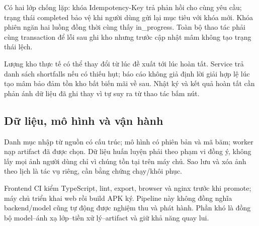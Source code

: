 Có hai lớp chống lặp: khóa Idempotency-\allowbreak{}Key trả phản hồi cho cùng yêu cầu; trạng thái completed bảo vệ khi người dùng gửi lại mục tiêu với khóa mới. Khóa phiên ngăn hai luồng đồng thời cùng thấy in\_\allowbreak{}progress. Toàn bộ thao tác phải cùng transaction để lỗi sau ghi kho nhưng trước cập nhật mâm không tạo trạng thái lệch.

Lượng kho thực tế có thể thay đổi từ lúc đề xuất tới lúc hoàn tất. Service trả danh sách shortfalls nếu có thiếu hụt; báo cáo không giả định lời giải hợp lệ lúc tạo mâm bảo đảm tồn kho bất biến mãi về sau. Nhật ký và kết quả hoàn tất cần phản ánh dữ liệu đã ghi thay vì tự suy ra từ thao tác bấm nút.

\subsection{Dữ liệu, mô hình và vận hành}
Danh mục nhập từ nguồn có cấu trúc; mô hình có phiên bản và mã băm; worker nạp artifact đã được chọn. Dữ liệu huấn luyện phải theo phạm vi đồng ý, không lấy mọi ảnh người dùng chỉ vì chúng tồn tại trên máy chủ. Sao lưu và xóa ảnh theo lịch là tác vụ riêng, cần bằng chứng chạy/\allowbreak{}khôi phục.

Frontend CI kiểm TypeScript, lint, export, browser và nginx trước khi promote; máy chủ triển khai web rồi build APK ký. Pipeline này không đồng nghĩa backend/\allowbreak{}model cũng tự động được nghiệm thu và phát hành. Phần khó là đồng bộ model--ánh xạ lớp--tiền xử lý--artifact và giữ khả năng quay lui.

